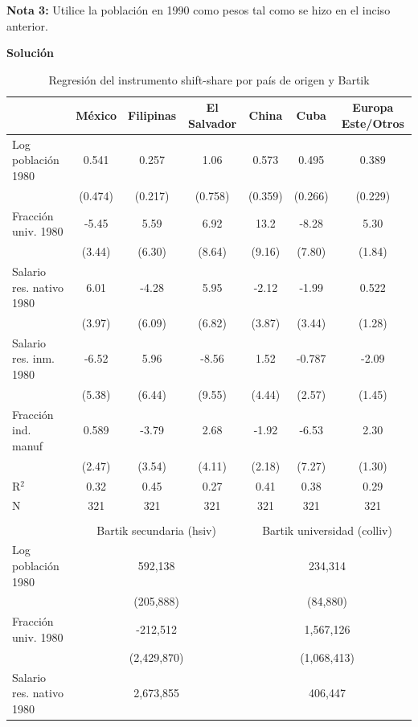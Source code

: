 \documentclass[a4paper, answers, addpoints, 11pt]{exam}
\newenvironment{solucion}{%
  \begin{mdframed}[
    backgroundcolor=blue!5,    %
    linecolor=blue!50,          %
    linewidth=2pt,              %
    leftmargin=10pt,            %
    rightmargin=8pt,           %
    topline=true,              %
    bottomline=true,            %
    roundcorner=10pt,           %
    innerleftmargin=10pt,       %
    innerrightmargin=10pt,      %
    innerbottommargin=10pt,     %
    innertopmargin=10pt         %
  ]%
  \begin{tcolorbox}[colframe=blue!50!black, colback=blue!50, coltitle=white, sharp corners=all, boxrule=1mm, width=\textwidth, halign=left, valign=center, top=0mm, bottom=0mm, left=0mm, right=0mm] \textbf{Solución} \end{tcolorbox} }{\end{mdframed}}
\begin{document}
\begin{itemize}
   \textbf{Nota 3:} Utilice la población en 1990 como pesos tal como se hizo en el inciso anterior. 
  \begin{solucion}
\begin{table}[H]
\centering
\small
\caption{Regresión del instrumento shift-share por país de origen y Bartik}
\label{tab:shric_regs_all}
\begin{tabular}{lcccccc}
\toprule
 & México & Filipinas & El Salvador & China & Cuba & Europa Este/Otros \\
\midrule
Log población 1980 & 0.541 & 0.257 & 1.06 & 0.573 & 0.495 & 0.389 \\
 & (0.474) & (0.217) & (0.758) & (0.359) & (0.266) & (0.229) \\
Fracción univ. 1980 & -5.45 & 5.59 & 6.92 & 13.2 & -8.28 & 5.30 \\
 & (3.44) & (6.30) & (8.64) & (9.16) & (7.80) & (1.84) \\
Salario res. nativo 1980 & 6.01 & -4.28 & 5.95 & -2.12 & -1.99 & 0.522 \\
 & (3.97) & (6.09) & (6.82) & (3.87) & (3.44) & (1.28) \\
Salario res. inm. 1980 & -6.52 & 5.96 & -8.56 & 1.52 & -0.787 & -2.09 \\
 & (5.38) & (6.44) & (9.55) & (4.44) & (2.57) & (1.45) \\
Fracción ind. manuf & 0.589 & -3.79 & 2.68 & -1.92 & -6.53 & 2.30 \\
 & (2.47) & (3.54) & (4.11) & (2.18) & (7.27) & (1.30) \\
\midrule
R$^2$ & 0.32 & 0.45 & 0.27 & 0.41 & 0.38 & 0.29 \\
N & 321 & 321 & 321 & 321 & 321 & 321 \\
\midrule
\multicolumn{7}{l}{} \\
\midrule
 & \multicolumn{3}{c}{Bartik secundaria (hsiv)} & \multicolumn{3}{c}{Bartik universidad (colliv)} \\
\cmidrule(lr){1-7} %
Log población 1980 & \multicolumn{3}{c}{592,138} & \multicolumn{3}{c}{234,314} \\
 & \multicolumn{3}{c}{(205,888)} & \multicolumn{3}{c}{(84,880)} \\
Fracción univ. 1980 & \multicolumn{3}{c}{-212,512} & \multicolumn{3}{c}{1,567,126} \\
 & \multicolumn{3}{c}{(2,429,870)} & \multicolumn{3}{c}{(1,068,413)} \\
Salario res. nativo 1980 & \multicolumn{3}{c}{2,673,855} & \multicolumn{3}{c}{406,447} \\

\end{tabular}
\end{table}
\end{solucion}
\end{itemize}
\end{document}
